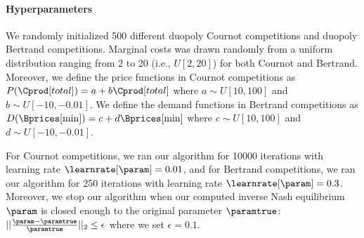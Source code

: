 \paragraph{Hyperparameters}
We randomly initialized 500 different duopoly Cournot competitions and duopoly Bertrand competitions. Marginal costs was drawn randomly from a uniform distribution ranging from 2 to 20 (i.e., $U[2,20]$) for both Cournot and Bertrand. Moreover, we define the price functions in Cournot competitions as $P(\Cprod[total]) = a + b\Cprod[total]$ where $a\sim U[10,100]$ and $b\sim U[-10, -0.01]$. We define the demand functions in Bertrand competitions as $D(\Bprices[\min])=c+d\Bprices[\min]$ where $c\sim U[10,100]$ and $d\sim U[-10, -0.01]$.

For Cournot competitions, we ran our algorithm for 10000 iterations with learning rate $\learnrate[\param]=0.01$, and for Bertrand competitions, we ran our algorithm for 250 iterations with learning rate $\learnrate[\param]=0.3$. Moreover, we stop our algorithm when our computed inverse Nash equilibrium $\param$ is closed enough to the original parameter $\paramtrue$: $||\frac{\param-\paramtrue}{\paramtrue}||_2\leq \epsilon$ where we set $\epsilon=0.1$.

